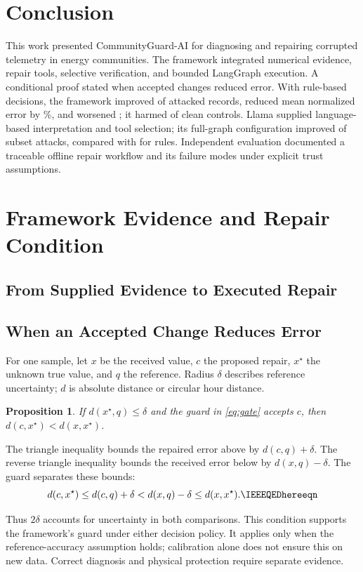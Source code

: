 \documentclass[conference]{IEEEtran}
\newtheorem{proposition}{Proposition}
\begin{document}
\FloatBarrier
\section{Conclusion}

This work presented CommunityGuard-AI for diagnosing and repairing corrupted telemetry in energy communities. The framework integrated numerical evidence, repair tools, selective verification, and bounded LangGraph execution. A conditional proof stated when accepted changes reduced error. With rule-based decisions, the framework improved \ImproveN{} of \CaseN{} attacked records, reduced mean normalized error by \ErrorReduction{}\%, and worsened \HarmN{}; it harmed \CleanHarmN{} of \CleanN{} clean controls. Llama supplied language-based interpretation and tool selection; its full-graph configuration improved \LlamaImprove{} of \PairedCaseN{} subset attacks, compared with \PairedRulesImprove{} for rules. Independent evaluation documented a traceable offline repair workflow and its failure modes under explicit trust assumptions.

\appendices

\section{Framework Evidence and Repair Condition}
\label{app:llama}
\label{app:proofs}

\subsection{From Supplied Evidence to Executed Repair}


\subsection{When an Accepted Change Reduces Error}
For one sample, let $x$ be the received value, $c$ the proposed repair, $x^\star$ the unknown true value, and $q$ the reference. Radius $\delta$ describes reference uncertainty; $d$ is absolute distance or circular hour distance.
\begin{proposition}
If $d(x^\star,q)\le\delta$ and the guard in \eqref{eq:gate} accepts $c$, then $d(c,x^\star)<d(x,x^\star)$.
\end{proposition}
\begin{IEEEproof}
The triangle inequality bounds the repaired error above by $d(c,q)+\delta$. The reverse triangle inequality bounds the received error below by $d(x,q)-\delta$. The guard separates these bounds:
\[
 d(c,x^\star)\le d(c,q)+\delta
 <d(x,q)-\delta\le d(x,x^\star).\IEEEQEDhereeqn
\]
\end{IEEEproof}
Thus $2\delta$ accounts for uncertainty in both comparisons. This condition supports the framework's guard under either decision policy. It applies only when the reference-accuracy assumption holds; calibration alone does not ensure this on new data. Correct diagnosis and physical protection require separate evidence.
\end{document}
